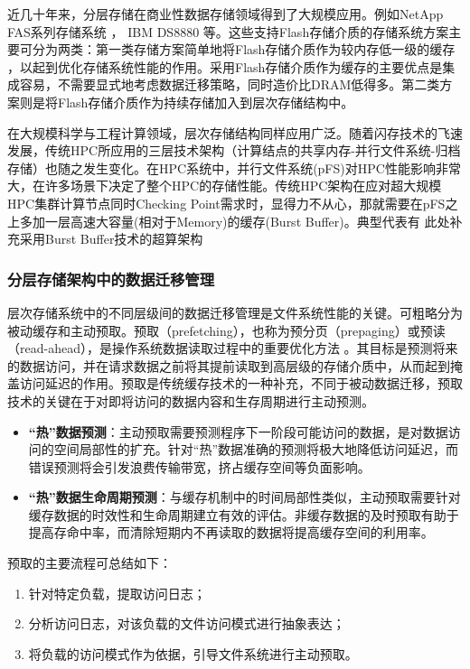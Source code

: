 近几十年来，分层存储在商业性数据存储领域得到了大规模应用。例如NetApp FAS系列存储系统
\cite{NetAppFas}，
IBM DS8880
\cite{IBMDS8880}
等。这些支持Flash存储介质的存储系统方案主要可分为两类：第一类存储方案简单地将Flash存储介质作为较内存低一级的缓存
\cite{NetAppFas}
，以起到优化存储系统性能的作用。采用Flash存储介质作为缓存的主要优点是集成容易，不需要显式地考虑数据迁移策略，同时造价比DRAM低得多。第二类方案则是将Flash存储介质作为持续存储加入到层次存储结构中。

在大规模科学与工程计算领域，层次存储结构同样应用广泛。随着闪存技术的飞速发展，传统HPC所应用的三层技术架构（计算结点的共享内存-并行文件系统-归档存储）也随之发生变化。在HPC系统中，并行文件系统(pFS)对HPC性能影响非常大，在许多场景下决定了整个HPC的存储性能。传统HPC架构在应对超大规模HPC集群计算节点同时Checking Point需求时，显得力不从心，那就需要在pFS之上多加一层高速大容量(相对于Memory)的缓存(Burst Buffer)。典型代表有
{\color{red}此处补充采用Burst Buffer技术的超算架构}

\subsubsection*{分层存储架构中的数据迁移管理}
层次存储系统中的不同层级间的数据迁移管理是文件系统性能的关键。可粗略分为被动缓存和主动预取。预取（prefetching），也称为预分页（prepaging）或预读（read-ahead），是操作系统数据读取过程中的重要优化方法
\cite{Reducing_File_System_Latency_using_a_Predictive_Approach}
\cite{Group_based_management_of_distributed_file_caches}
\cite{A_data_mining_algorithm_for_generalized_web_prefetching}
。其目标是预测将来的数据访问，并在请求数据之前将其提前读取到高层级的存储介质中，从而起到掩盖访问延迟的作用。预取是传统缓存技术的一种补充，不同于被动数据迁移，预取技术的关键在于对即将访问的数据内容和生存周期进行主动预测。

\begin{itemize}
\item \textbf{“热”数据预测}：主动预取需要预测程序下一阶段可能访问的数据，是对数据访问的空间局部性的扩充。针对“热”数据准确的预测将极大地降低访问延迟，而错误预测将会引发浪费传输带宽，挤占缓存空间等负面影响。
\item \textbf{“热”数据生命周期预测}：与缓存机制中的时间局部性类似，主动预取需要针对缓存数据的时效性和生命周期建立有效的评估。非缓存数据的及时预取有助于提高存命中率，而清除短期内不再读取的数据将提高缓存空间的利用率。
\end{itemize}

预取的主要流程可总结如下：
\begin{enumerate}
\item 针对特定负载，提取访问日志；
\item 分析访问日志，对该负载的文件访问模式进行抽象表达；
\item 将负载的访问模式作为依据，引导文件系统进行主动预取。
\end{enumerate}

